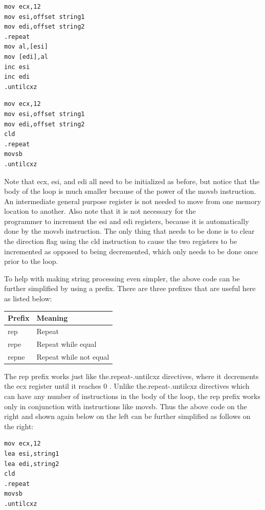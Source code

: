 \documentclass[10pt]{article}
\begin{document}
\begin{verbatim}
mov ecx,12
mov esi,offset string1
mov edi,offset string2
.repeat
mov al,[esi]
mov [edi],al
inc esi
inc edi
.untilcxz
\end{verbatim}

\begin{verbatim}
mov ecx,12
mov esi,offset string1
mov edi,offset string2
cld
.repeat
movsb
.untilcxz
\end{verbatim}

Note that ecx, esi, and edi all need to be initialized as before, but notice that the body of the loop is much smaller because of the power of the movsb instruction. An intermediate general purpose register is not needed to move from one memory location to another. Also note that it is not necessary for the\\
programmer to increment the esi and edi registers, because it is automatically done by the movsb instruction. The only thing that needs to be done is to clear the direction flag using the cld instruction to cause the two registers to be incremented as opposed to being decremented, which only needs to be done once prior to the loop.

To help with making string processing even simpler, the above code can be further simplified by using a prefix. There are three prefixes that are useful here as listed below:

\begin{center}
\begin{tabular}{|l|l|}
\hline
Prefix & Meaning \\
\hline
rep & Repeat \\
\hline
repe & Repeat while equal \\
\hline
repne & Repeat while not equal \\
\hline
\end{tabular}
\end{center}

The rep prefix works just like the.repeat-.untilcxz directives, where it decrements the ecx register until it reaches 0 . Unlike the.repeat-.untilcxz directives which can have any number of instructions in the body of the loop, the rep prefix works only in conjunction with instructions like movsb. Thus the above code on the right and shown again below on the left can be further simplified as follows on the right:

\begin{verbatim}
mov ecx,12
lea esi,string1
lea edi,string2
cld
.repeat
movsb
.untilcxz
\end{verbatim}
\end{document}
